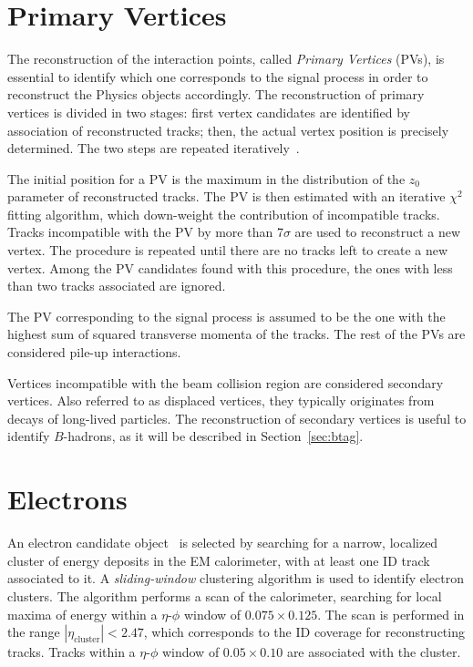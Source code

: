 \section{Primary Vertices}
\label{sec:pv}

The reconstruction of the interaction points, called {\it Primary
  Vertices} (PVs), is essential to identify which one corresponds to the signal
process in order to reconstruct the Physics objects accordingly.
The reconstruction of primary vertices is divided in two stages: first
vertex candidates are identified by association of reconstructed
tracks; then, the actual vertex position is precisely determined.
The two steps are repeated iteratively~\cite{vertexalgo}.

The initial position for a PV is the maximum in the distribution of
the $z_0$ parameter of reconstructed tracks. The PV is then
estimated with an iterative $\chi^2$ fitting algorithm, which
down-weight the contribution of incompatible tracks. Tracks
incompatible with the PV by more than 7$\sigma$ are used to
reconstruct a new vertex. The procedure is repeated until there are no
tracks left to create a new vertex. Among the PV candidates found with
this procedure, the ones with less than two tracks associated are ignored. 

The PV corresponding to the signal process is assumed to be the one with
the highest sum of squared transverse momenta of the tracks. The rest
of the PVs are considered pile-up interactions.

Vertices incompatible with the beam collision region are considered
secondary vertices.
Also referred to as displaced vertices, they typically originates from
decays of long-lived particles.
The reconstruction of secondary vertices is useful to identify
$B$-hadrons, as it will be described in Section~\ref{sec:btag}.

\section{Electrons}
\label{sec:electrons}

An electron candidate object~\cite{elereco} is selected by searching 
for a narrow, 
localized cluster of energy deposits in the EM calorimeter, 
with at least one ID track associated to it.
A {\it sliding-window} clustering algorithm is used to identify electron 
clusters. The algorithm performs a scan of the calorimeter, searching 
for local maxima of energy
within a $\eta$-$\phi$ window of $0.075\times{}0.125$.
The scan is performed in the range $|\eta_{\mathrm{cluster}}|<2.47$, 
which corresponds to the ID coverage for reconstructing tracks. 
Tracks within a $\eta$-$\phi$ window of $0.05\times{}0.10$ are 
associated with the cluster.

